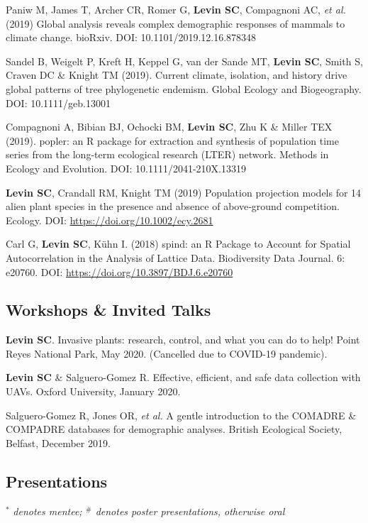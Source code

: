 \documentclass[11pt,]{article}
\begin{document}
Paniw M, James T, Archer CR, Romer G, \textbf{Levin SC}, Compagnoni AC,
\emph{et al.} (2019) Global analysis reveals complex demographic
responses of mammals to climate change. bioRxiv. DOI:
10.1101/2019.12.16.878348

Sandel B, Weigelt P, Kreft H, Keppel G, van der Sande MT, \textbf{Levin
SC}, Smith S, Craven DC \& Knight TM (2019). Current climate, isolation,
and history drive global patterns of tree phylogenetic endemism. Global
Ecology and Biogeography. DOI: 10.1111/geb.13001

Compagnoni A, Bibian BJ, Ochocki BM, \textbf{Levin SC}, Zhu K \& Miller
TEX (2019). popler: an R package for extraction and synthesis of
population time series from the long-term ecological research (LTER)
network. Methods in Ecology and Evolution. DOI: 10.1111/2041-210X.13319

\textbf{Levin SC}, Crandall RM, Knight TM (2019) Population projection
models for 14 alien plant species in the presence and absence of
above‐ground competition. Ecology. DOI:
\url{https://doi.org/10.1002/ecy.2681}

Carl G, \textbf{Levin SC}, Kühn I. (2018) spind: an R Package to Account
for Spatial Autocorrelation in the Analysis of Lattice Data.
Biodiversity Data Journal. 6: e20760. DOI:
\url{https://doi.org/10.3897/BDJ.6.e20760}

\hypertarget{workshops-invited-talks}{%
\subsection{Workshops \& Invited Talks}\label{workshops-invited-talks}}

\textbf{Levin SC}. Invasive plants: research, control, and what you can
do to help! Point Reyes National Park, May 2020. (Cancelled due to
COVID-19 pandemic).

\textbf{Levin SC} \& Salguero-Gomez R. Effective, efficient, and safe
data collection with UAVs. Oxford University, January 2020.

Salguero-Gomez R, Jones OR, \emph{et al.} A gentle introduction to the
COMADRE \& COMPADRE databases for demographic analyses. British
Ecological Society, Belfast, December 2019.

\hypertarget{presentations}{%
\subsection{Presentations}\label{presentations}}

\(^\ast\) \emph{denotes mentee; \(^\#\) denotes poster presentations,
otherwise oral}
\end{document}
